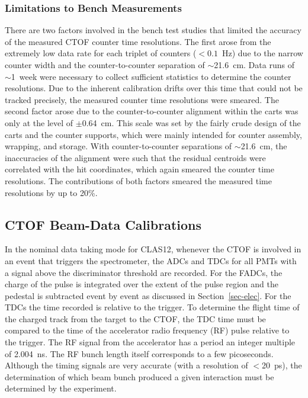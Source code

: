 \documentclass{elsart}
\begin{document}
\subsubsection{Limitations to Bench Measurements}
\label{res-limitations}

There are two factors involved in the bench test studies that limited the accuracy of the measured
CTOF counter time resolutions. The first arose from the extremely low data rate for each triplet 
of counters ($< 0.1$~Hz) due to the narrow counter width and the counter-to-counter separation of 
$\sim$21.6~cm. Data runs of $\sim$1~week were necessary to collect sufficient statistics to 
determine the counter resolutions. Due to the inherent calibration drifts over this time that 
could not be tracked precisely, the measured counter time resolutions were smeared. The second
factor arose due to the counter-to-counter alignment within the carts was only at the level of
$\pm$0.64~cm. This scale was set by the fairly crude design of the carts and the counter supports,
which were mainly intended for counter assembly, wrapping, and storage. With counter-to-counter
separations of $\sim$21.6~cm, the inaccuracies of the alignment were such that the residual centroids
were correlated with the hit coordinates, which again smeared the counter time resolutions. The
contributions of both factors smeared the measured time resolutions by up to 20\%. 

\subsection{CTOF Beam-Data Calibrations}

In the nominal data taking mode for CLAS12, whenever the CTOF is involved in an event that triggers
the spectrometer, the ADCs and TDCs for all PMTs with a signal above the discriminator threshold
are recorded. For the FADCs, the charge of the pulse is integrated over the extent of the pulse
region and the pedestal is subtracted event by event as discussed in Section~\ref{sec-elec}. For the
TDCs the time recorded is relative to the trigger. To determine the flight time of the charged track
from the target to the CTOF, the TDC time must be compared to the time of the accelerator radio
frequency (RF) pulse relative to the trigger. The RF signal from the accelerator has a period an integer
multiple of 2.004~ns. The RF bunch length itself corresponds to a few picoseconds. Although the timing
signals are very accurate (with a resolution of $<$20~ps), the determination of which beam bunch
produced a given interaction must be determined by the experiment.
\end{document}
